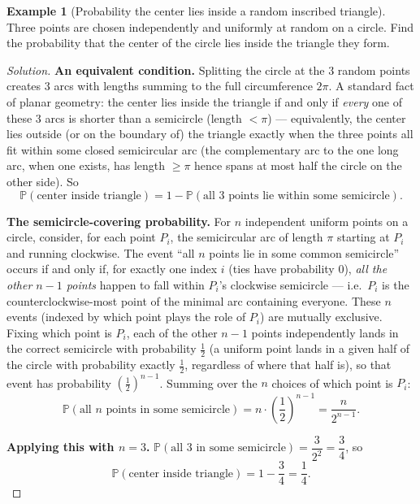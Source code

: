 \documentclass[11pt]{article}
\theoremstyle{definition}
\newtheorem{example}{Example}[section]
\begin{document}
\begin{example}[Probability the center lies inside a random inscribed triangle]
Three points are chosen independently and uniformly at random on a circle. Find the probability that the center of the circle lies inside the triangle they form.
\end{example}
\begin{proof}[Solution]
\textbf{An equivalent condition.} Splitting the circle at the $3$ random points creates $3$ arcs with lengths summing to the full circumference $2\pi$. A standard fact of planar geometry: the center lies inside the triangle if and only if \emph{every} one of these $3$ arcs is shorter than a semicircle (length $<\pi$) — equivalently, the center lies outside (or on the boundary of) the triangle exactly when the three points all fit within some closed semicircular arc (the complementary arc to the one long arc, when one exists, has length $\ge\pi$ hence spans at most half the circle on the other side). So
\[
\mathbb P(\text{center inside triangle})=1-\mathbb P(\text{all 3 points lie within some semicircle}).
\]

\textbf{The semicircle-covering probability.} For $n$ independent uniform points on a circle, consider, for each point $P_i$, the semicircular arc of length $\pi$ starting at $P_i$ and running clockwise. The event ``all $n$ points lie in some common semicircle'' occurs if and only if, for exactly one index $i$ (ties have probability $0$), \emph{all the other $n-1$ points} happen to fall within $P_i$'s clockwise semicircle — i.e.\ $P_i$ is the counterclockwise-most point of the minimal arc containing everyone. These $n$ events (indexed by which point plays the role of $P_i$) are mutually exclusive. Fixing which point is $P_i$, each of the other $n-1$ points independently lands in the correct semicircle with probability $\tfrac12$ (a uniform point lands in a given half of the circle with probability exactly $\tfrac12$, regardless of where that half is), so that event has probability $\left(\tfrac12\right)^{n-1}$. Summing over the $n$ choices of which point is $P_i$:
\[
\mathbb P(\text{all }n\text{ points in some semicircle})=n\cdot\left(\frac12\right)^{n-1}=\frac{n}{2^{n-1}}.
\]

\textbf{Applying this with $n=3$.} $\mathbb P(\text{all 3 in some semicircle})=\dfrac{3}{2^2}=\dfrac34$, so
\[
\mathbb P(\text{center inside triangle})=1-\frac34=\boxed{\frac14}.
\]
\end{proof}
\end{document}
